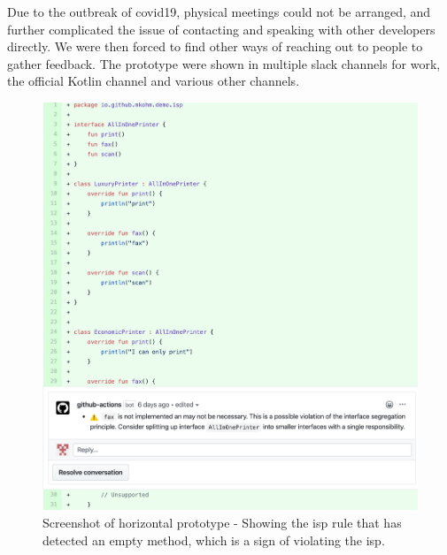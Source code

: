 \documentclass[pdftex,10pt,b5paper,twoside]{report}
\begin{document}
Due to the outbreak of \gls{covid19}, physical meetings could not be arranged, and further complicated the issue of contacting and speaking with other developers directly. We were then forced to find other ways of reaching out to people to gather feedback. The prototype were shown in multiple slack channels for work, the official Kotlin channel and various other channels.

\begin{figure}[h!]
    \centering
    \includegraphics[width=\textwidth]{images/final_isp.png}
    \caption{Screenshot of horizontal prototype - Showing the \gls{isp} rule that has detected an empty method, which is a sign of violating the \gls{isp}.}
    \label{fig:horizontal-prototype}
\end{figure}
\end{document}
